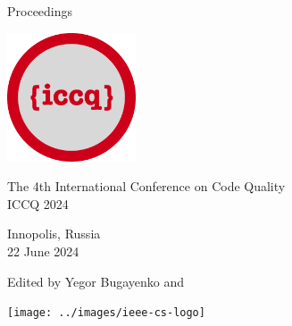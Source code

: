 
\thispagestyle{empty}
\begin{center}
Proceedings

\vspace{1in}

\includegraphics[height=1.5in]{../../logo}

\vspace{0.5in}

{\Large The 4th International Conference on Code Quality\\[12pt]
ICCQ 2024}

\vspace{0.5in}

Innopolis, Russia\\
22 June 2024

\vspace{0.5in}

Edited by Yegor Bugayenko and 

\vspace{1.5in}




\texttt{[image: ../images/ieee-cs-logo]}

\end{center}
